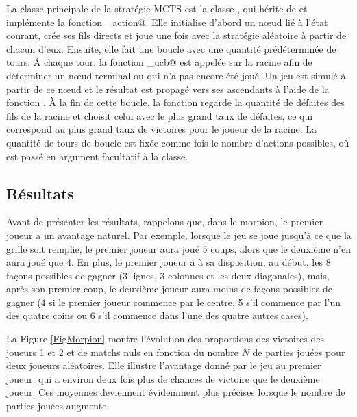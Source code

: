 \documentclass[a4paper,11pt]{article}
\begin{document}
La classe principale de la stratégie MCTS est la classe \verb@AgentMCTS@, qui hérite de \verb@Agent@ et implémente la fonction \verb@get_action@. Elle initialise d'abord un n\oe{}ud \verb@racine@ lié à l'état courant, crée ses fils directs et joue une fois avec la stratégie aléatoire à partir de chacun d'eux. Ensuite, elle fait une boucle avec une quantité prédéterminée de tours. À chaque tour, la fonction \verb@choix_ucb@ est appelée sur la racine afin de déterminer un n\oe{}ud terminal ou qui n'a pas encore été joué. Un jeu est simulé à partir de ce n\oe{}ud et le résultat est propagé vers ses ascendants à l'aide de la fonction \verb@maj@. À la fin de cette boucle, la fonction regarde la quantité de défaites des fils de la racine et choisit celui avec le plus grand taux de défaites, ce qui correspond au plus grand taux de victoires pour le joueur de la racine. La quantité de tours de boucle est fixée comme \verb@n@ fois le nombre d'actions possibles, où \verb@n@ est passé en argument facultatif à la classe.

\subsection{Résultats}

Avant de présenter les résultats, rappelons que, dans le morpion, le premier joueur a un avantage naturel. Par exemple, lorsque le jeu se joue jusqu'à ce que la grille soit remplie, le premier joueur aura joué 5 coups, alors que le deuxième n'en aura joué que 4. En plus, le premier joueur a à sa disposition, au début, les 8 façons possibles de gagner (3 lignes, 3 colonnes et les deux diagonales), mais, après son premier coup, le deuxième joueur aura moins de façons possibles de gagner (4 si le premier joueur commence par le centre, 5 s'il commence par l'un des quatre coins ou 6 s'il commence dans l'une des quatre autres cases).

La Figure \ref{FigMorpion} montre l'évolution des proportions des victoires des joueurs 1 et 2 et de matchs nuls en fonction du nombre $N$ de parties jouées pour deux joueurs aléatoires. Elle illustre l'avantage donné par le jeu au premier joueur, qui a environ deux fois plus de chances de victoire que le deuxième joueur. Ces moyennes deviennent évidemment plus précises lorsque le nombre de parties jouées augmente.
\end{document}

